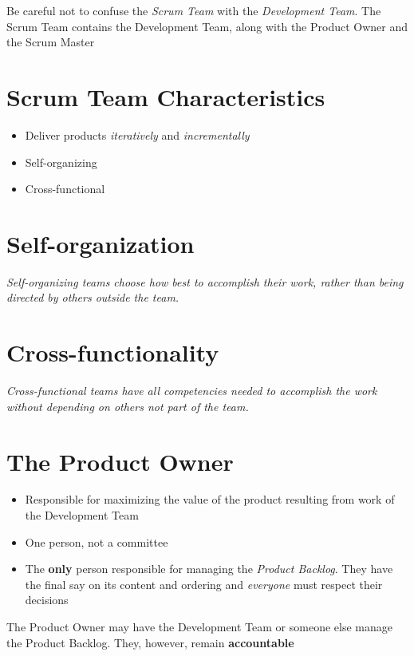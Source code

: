 \documentclass[a4paper,11pt,twocolumn]{article}
\begin{document}
\begin{tcolorbox}[colback=black!8!white,colframe=gray!50!black,title=Note,sharp corners,fonttitle=\normalsize\bfseries,fontupper=\normalsize,left=0.7em,right=0.7em]
	Be careful not to confuse the \textit{Scrum Team} with the \textit{Development Team}. The Scrum Team contains the Development Team, along with the Product Owner and the Scrum Master
\end{tcolorbox}

\section*{Scrum Team Characteristics}
\begin{itemize}
	\item Deliver products \textit{iteratively} and \textit{incrementally}
	\item Self-organizing
	\item Cross-functional
\end{itemize}

\section*{Self-organization}
\textit{Self-organizing teams choose how best to accomplish their work, rather than being directed by others outside the team.}

\section*{Cross-functionality}
\textit{Cross-functional teams have all competencies needed to accomplish the work without depending on others not part of the team.}

\section*{The Product Owner}
\begin{itemize}
    \item Responsible for maximizing the value of the product resulting from work of the Development Team
	\item One person, not a committee
    \item The \textbf{only} person responsible for managing the \textit{Product Backlog}. They have the final say on its content and ordering and \textit{everyone} must respect their decisions
\end{itemize}

\begin{tcolorbox}[colback=black!8!white,colframe=gray!50!black,title=Note,sharp corners,fonttitle=\normalsize\bfseries,fontupper=\normalsize,left=0.7em,right=0.7em]
	The Product Owner may have the Development Team or someone else manage the Product Backlog. They, however, remain \textbf{accountable}
\end{tcolorbox}
\end{document}
